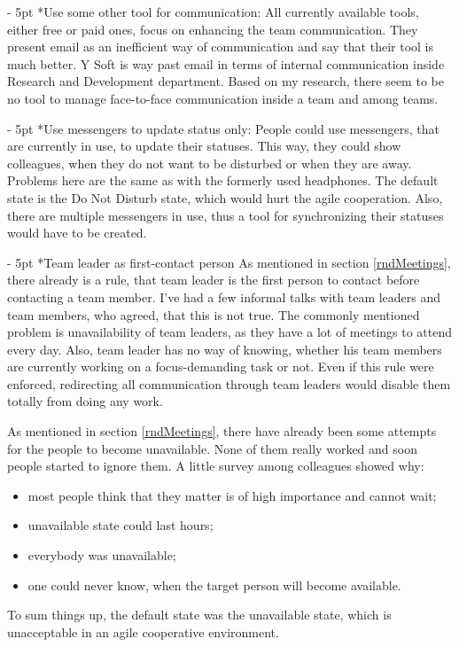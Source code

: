 \documentclass[11pt,singleside]{myfithesis2}
\makeatletter
\renewcommand\paragraph{
   \vspace{-10pt}
   \@startsection{paragraph}{4}{0mm}
      {\baselineskip}
      {- 5pt}
      {\normalfont\normalsize\bfseries}
}
\makeatother
\begin{document}
\paragraph*{Use some other tool for communication: } All currently available tools, either free or paid ones, focus on enhancing the team communication. They present email as an inefficient way of communication and say that their tool is much better. Y Soft is way past email in terms of internal communication inside Research and Development department. Based on my research, there seem to be no tool to manage face-to-face communication inside a team and among teams.

\paragraph*{Use messengers to update status only: } People could use messengers, that are currently in use, to update their statuses. This way, they could show colleagues, when they do not want to be disturbed or when they are away. Problems here are the same as with the formerly used headphones. The default state is the Do Not Disturb state, which would hurt the agile cooperation. Also, there are multiple messengers in use, thus a tool for synchronizing their statuses would have to be created.

\paragraph*{Team leader as first-contact person} As mentioned in section \ref{rndMeetings}, there already is a rule, that team leader is the first person to contact before contacting a team member. I've had a few informal talks with team leaders and team members, who agreed, that this is not true. The commonly mentioned problem is unavailability of team leaders, as they have a lot of meetings to attend every day. Also, team leader has no way of knowing, whether his team members are currently working on a focus-demanding task or not. Even if this rule were enforced, redirecting all communication through team leaders would disable them totally from doing any work.

As mentioned in section \ref{rndMeetings}, there have already been some attempts for the people to become unavailable. None of them really worked and soon people started to ignore them. A little survey among colleagues showed why:
\begin{itemize}
	\item most people think that they matter is of high importance and cannot wait;
	\item unavailable state could last hours;
	\item everybody was unavailable;
	\item one could never know, when the target person will become available.
\end{itemize}
To sum things up, the default state was the unavailable state, which is unacceptable in an agile cooperative environment.
\end{document}
